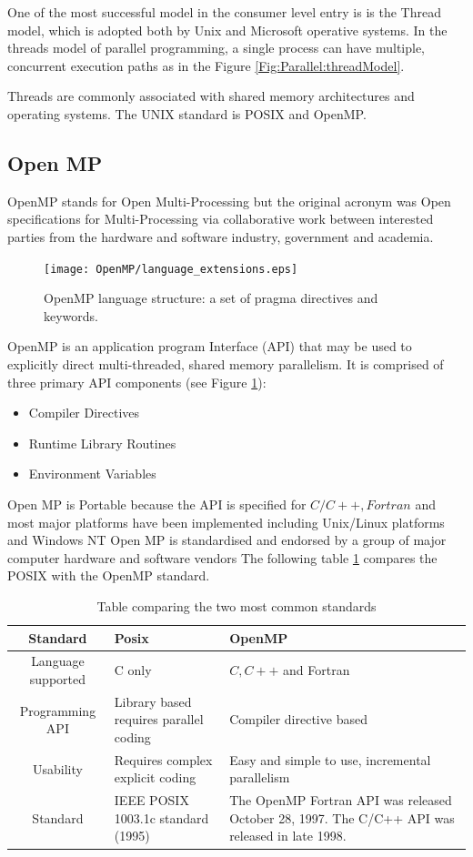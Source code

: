 One of the most successful model in the consumer level entry is is the
Thread model, which is adopted both
by Unix and Microsoft operative systems.
In the threads model of parallel programming, a single process can have
 multiple, concurrent execution paths as in the Figure \ref{Fig:Parallel:threadModel}.

Threads are commonly associated with shared memory architectures
and operating systems.
The UNIX standard is POSIX and OpenMP.
\subsection{Open MP}
OpenMP stands for Open Multi-Processing but the original acronym was
Open specifications for Multi-Processing via collaborative work between
interested parties from the hardware and software industry, government and academia.

\begin{figure}[htbp]
\begin{center}
\texttt{[image: OpenMP/language\_extensions.eps]}
\end{center}
\small{
\caption[OpenMP language]{
OpenMP language structure: a set of pragma directives and keywords.
\label{Fig:Parallel:language}}}
\end{figure}

OpenMP is an application program Interface (API) that may be used to explicitly
 direct multi-threaded, shared memory parallelism.
It is comprised of three primary API components (see Figure \ref{Fig:Parallel:language}):
\begin{itemize}
\item Compiler Directives
\item Runtime Library Routines
\item Environment Variables
\end{itemize}
Open MP is Portable because the API is specified for $C/C++,Fortran$ and
most major platforms have been implemented including Unix/Linux platforms and Windows NT
Open MP is standardised and endorsed by a group of major computer hardware
and software vendors
The following table \ref{tab:Parallel:comparison} compares the POSIX with
the OpenMP standard.


\begin{table}[htbp]
\centering
\begin{tabular}{| c| p{3.5 cm} | p{3.5 cm} |}
\hline
Standard & Posix & OpenMP \\
\hline
Language supported & C only & $C,C++$ and Fortran\\
\hline
Programming API & Library based requires parallel coding & Compiler directive based \\
\hline
Usability & Requires complex explicit coding & Easy and simple to use, incremental parallelism \\
\hline
Standard & IEEE POSIX 1003.1c standard (1995) & The OpenMP Fortran API was released October 28, 1997. The C/C++ API was released in late 1998.  \\
\hline
\end{tabular}
\caption[Posix vs OpenMP standard]{Table comparing the two most common standards}
\label{tab:Parallel:comparison}
\end{table}

